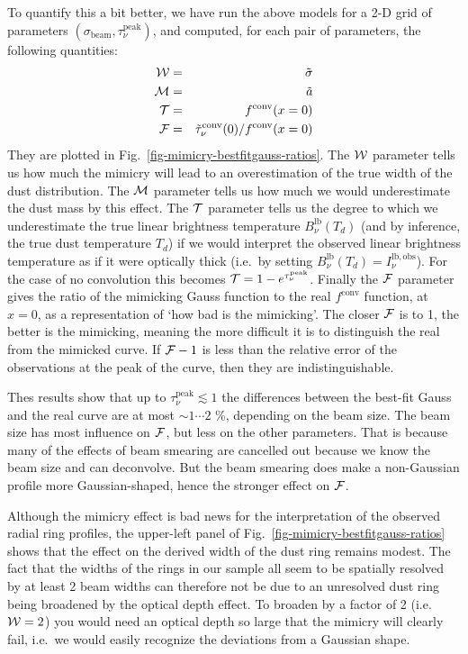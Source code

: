 \documentclass{aa}
\begin{document}
To quantify this a bit better, we have run the above models for a 2-D grid of
parameters $(\sigma_{\mathrm{beam}},\tau_\nu^{\mathrm{peak}})$, and computed, for
each pair of parameters, the following quantities:
\begin{eqnarray}
  {\cal W} &=& \tilde\sigma \\
  {\cal M} &=& \tilde a \\
  {\cal T} &=& f^{\mathrm{conv}}(x=0)\\
  {\cal F} &=& \tilde \tau_\nu^{\mathrm{conv}}(0)/f^{\mathrm{conv}}(x=0)
\end{eqnarray}
They are plotted in Fig.~\ref{fig-mimicry-bestfitgauss-ratios}. The ${\cal W}$
parameter tells us how much the mimicry will lead to an overestimation of the
true width of the dust distribution. The ${\cal M}$ parameter tells us how much we
would underestimate the dust mass by this effect. The ${\cal T}$ parameter tells
us the degree to which we underestimate the true linear brightness temperature
$B_\nu^{\mathrm{lb}}(T_d)$ (and by inference, the true dust temperature $T_d$)
if we would interpret the observed linear brightness temperature as if it were
optically thick (i.e.~by setting
$B_\nu^{\mathrm{lb}}(T_d)=I_{\nu}^{\mathrm{lb,obs}}$). For the case of no
convolution this becomes ${\cal T}=1-e^{\tau_\nu^{\mathrm{peak}}}$. Finally the
${\cal F}$ parameter gives the ratio of the mimicking Gauss function to the real
$f^{\mathrm{conv}}$ function, at $x=0$, as a representation of `how bad is the
mimicking'. The closer ${\cal F}$ is to 1, the better is the mimicking, meaning
the more difficult it is to distinguish the real from the mimicked curve.
If ${\cal F}-1$ is less than the relative error of the observations at the
peak of the curve, then they are indistinguishable.

Thes results show that up to $\tau_\nu^{\mathrm{peak}}\lesssim 1$ the
differences between the best-fit Gauss and the real curve are at most $\sim
1\cdots 2$ \%, depending on the beam size. The beam size has most influence
on ${\cal F}$, but less on the other parameters. That is because many of the
effects of beam smearing are cancelled out because we know the beam size and
can deconvolve. But the beam smearing does make a non-Gaussian profile more
Gaussian-shaped, hence the stronger effect on ${\cal F}$. 

Although the mimicry effect is bad news for the interpretation of the observed
radial ring profiles, the upper-left panel of
Fig.~\ref{fig-mimicry-bestfitgauss-ratios} shows that the effect on the derived
width of the dust ring remains modest. The fact that the widths of the rings in
our sample all seem to be spatially resolved by at least 2 beam widths can
therefore not be due to an unresolved dust ring being broadened by the optical
depth effect. To broaden by a factor of 2 (i.e.~${\cal W}=2$) you would need
an optical depth so large that the mimicry will clearly fail, i.e.\ we would
easily recognize the deviations from a Gaussian shape.
\end{document}
